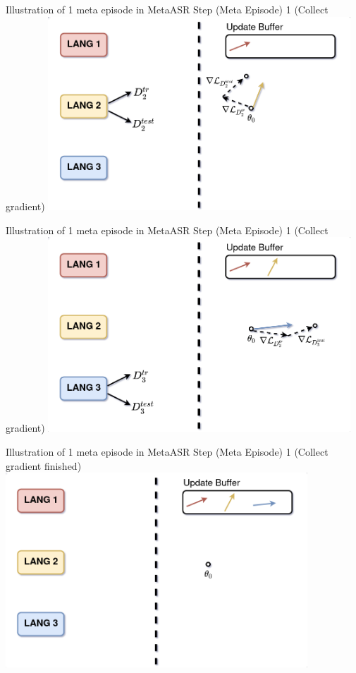 \documentclass{beamer}
\begin{document}
\begin{frame}[t]{Illustration of 1 meta episode in MetaASR}
  Step (Meta Episode) 1 (Collect gradient)
  \center \includegraphics[width=0.85\textwidth]{fig/meta_step2.png}
\end{frame}

\begin{frame}[t]{Illustration of 1 meta episode in MetaASR}
  Step (Meta Episode) 1 (Collect gradient)
  \center \includegraphics[width=0.85\textwidth]{fig/meta_step3.png}
\end{frame}

\begin{frame}[t]{Illustration of 1 meta episode in MetaASR}
  Step (Meta Episode) 1 (Collect gradient finished)
  \center \includegraphics[width=0.85\textwidth]{fig/meta_before_update.png}
\end{frame}
\end{document}
